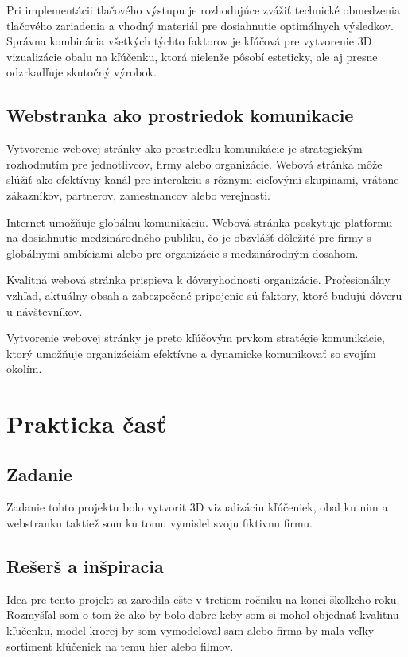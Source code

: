       Pri implementácii tlačového výstupu je rozhodujúce zvážiť technické obmedzenia tlačového zariadenia a vhodný materiál pre dosiahnutie optimálnych výsledkov. Správna kombinácia všetkých týchto faktorov je kľúčová pre vytvorenie 3D vizualizácie obalu na kľúčenku, ktorá nielenže pôsobí esteticky, ale aj presne odzrkadľuje skutočný výrobok.

    \subsection{Webstranka ako prostriedok komunikacie}
      Vytvorenie webovej stránky ako prostriedku komunikácie je strategickým rozhodnutím pre jednotlivcov, firmy alebo organizácie. Webová stránka môže slúžiť ako efektívny kanál pre interakciu s rôznymi cieľovými skupinami, vrátane zákazníkov, partnerov, zamestnancov alebo verejnosti. 

      Internet umožňuje globálnu komunikáciu. Webová stránka poskytuje platformu na dosiahnutie medzinárodného publiku, čo je obzvlášť dôležité pre firmy s globálnymi ambíciami alebo pre organizácie s medzinárodným dosahom.
    
      Kvalitná webová stránka prispieva k dôveryhodnosti organizácie. Profesionálny vzhľad, aktuálny obsah a zabezpečené pripojenie sú faktory, ktoré budujú dôveru u návštevníkov.


      Vytvorenie webovej stránky je preto kľúčovým prvkom stratégie komunikácie, ktorý umožňuje organizáciám efektívne a dynamicke komunikovať so svojím okolím.

  \newpage

  \section{Prakticka časť}
    \subsection{Zadanie}
      Zadanie tohto projektu bolo vytvorit 3D vizualizáciu kľúčeniek, obal ku nim a webstranku taktiež som ku tomu vymislel svoju fiktivnu firmu.

    \subsection{Rešerš a inšpiracia}
      Idea pre tento projekt sa zarodila ešte v tretiom ročniku na konci školkeho roku. Rozmyšľal som o tom že ako by bolo dobre keby som si mohol objednať kvalitnu kľučenku, model krorej by som vymodeloval sam alebo firma by mala veľky sortiment kľúčeniek na temu hier alebo filmov.

